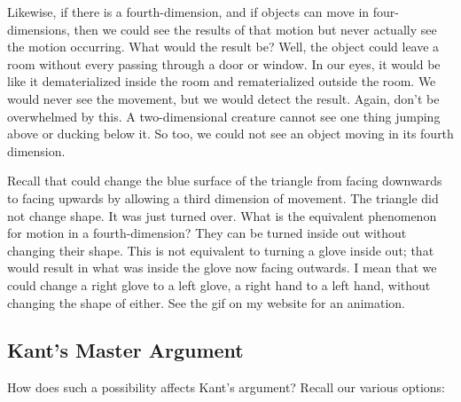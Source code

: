 \documentclass[oneside]{article}
\begin{document}
Likewise, if there is a fourth-dimension, and if objects can move in four-dimensions, then we could see the results of that motion but never actually see the motion occurring. What would the result be? Well, the object could leave a room without every passing through a door or window. In our eyes, it would be like it dematerialized inside the room and rematerialized outside the room. We would never see the movement, but we would detect the result. Again, don't be overwhelmed by this. A two-dimensional creature cannot see one thing jumping above or ducking below it. So too, we could not see an object moving in its fourth dimension. 

Recall that could change the blue surface of the triangle from facing downwards to facing upwards by allowing a third dimension of movement. The triangle did not change shape. It was just turned over. What is the equivalent phenomenon for motion in a fourth-dimension? They can be turned inside out without changing their shape. This is not equivalent to turning a glove inside out; that would result in what was inside the glove now facing outwards. I mean that we could change a right glove to a left glove, a right hand to a left hand, without changing the shape of either. See the gif on my website for an animation.

 

\subsection*{Kant's Master Argument}

How does such a possibility affects Kant's argument? Recall our various options: 
\end{document}
